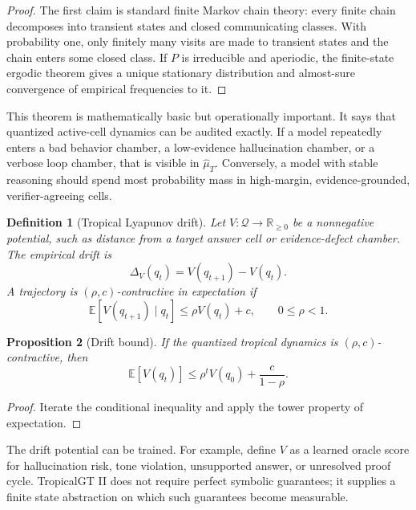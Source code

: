 \documentclass[11pt]{article}
\newtheorem{definition}{Definition}[section]
\newtheorem{proposition}[definition]{Proposition}
\newcommand{\R}{\mathbb{R}}
\newcommand{\E}{\mathbb{E}}
\newcommand{\calQ}{\mathcal{Q}}
\begin{document}
\begin{proof}
The first claim is standard finite Markov chain theory: every finite chain decomposes into transient states and closed communicating classes.  With probability one, only finitely many visits are made to transient states and the chain enters some closed class.  If \(P\) is irreducible and aperiodic, the finite-state ergodic theorem gives a unique stationary distribution and almost-sure convergence of empirical frequencies to it.
\end{proof}

This theorem is mathematically basic but operationally important.  It says that quantized active-cell dynamics can be audited exactly.  If a model repeatedly enters a bad behavior chamber, a low-evidence hallucination chamber, or a verbose loop chamber, that is visible in \(\hat\mu_T\).  Conversely, a model with stable reasoning should spend most probability mass in high-margin, evidence-grounded, verifier-agreeing cells.

\begin{definition}[Tropical Lyapunov drift]
Let \(V:\calQ\to\R_{\ge0}\) be a nonnegative potential, such as distance from a target answer cell or evidence-defect chamber.  The empirical drift is
\begin{equation}
\Delta_V(q_t)=V(q_{t+1})-V(q_t).
\end{equation}
A trajectory is \((\rho,c)\)-contractive in expectation if
\begin{equation}
\E[V(q_{t+1})\mid q_t]\le \rho V(q_t)+c,
\qquad 0\le\rho<1.
\end{equation}
\end{definition}

\begin{proposition}[Drift bound]
If the quantized tropical dynamics is \((\rho,c)\)-contractive, then
\begin{equation}
\E[V(q_t)]\le \rho^t V(q_0)+\frac{c}{1-\rho}.
\end{equation}
\end{proposition}

\begin{proof}
Iterate the conditional inequality and apply the tower property of expectation.
\end{proof}

The drift potential can be trained.  For example, define \(V\) as a learned oracle score for hallucination risk, tone violation, unsupported answer, or unresolved proof cycle.  TropicalGT II does not require perfect symbolic guarantees; it supplies a finite state abstraction on which such guarantees become measurable.
\end{document}

